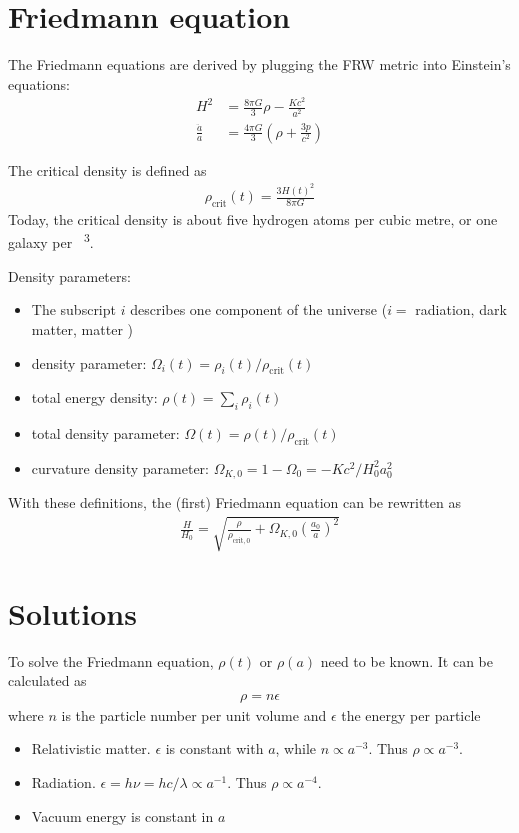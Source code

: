 \section{Friedmann equation}
\label{sec:Friedmann}

The Friedmann equations are derived by plugging the FRW metric into Einstein's equations:
\begin{align*}
	H^2 &= \frac{8 \pi G}{3} \rho - \frac{K c^2}{a^2}\\
	\frac{\ddot{a}}{a} &= \frac{4 \pi G}{3} \left( \rho + \frac{3 p}{c^2} \right)
\end{align*}

The critical density is defined as
\begin{align*}
	\rho_\text{crit}(t) = \frac{3 H(t)^2}{8 \pi G}
\end{align*}
Today, the critical density is about five hydrogen atoms per cubic metre, or one galaxy per \si{\mega\parsec\cubed}.

Density parameters:
\begin{itemize}
	\item The subscript $i$ describes one component of the universe ($i = $ radiation, dark matter, matter \textellipsis)
	\item density parameter: $\Omega_i(t) = \rho_i(t)/\rho_\text{crit}(t)$
	\item total energy density: $\rho(t) = \sum_{i} \rho_i(t)$
	\item total density parameter: $\Omega(t) = \rho(t)/\rho_\text{crit}(t)$
	\item curvature density parameter: $\Omega_{K,0} = 1 - \Omega_0 = - Kc^2/H_0^2 a_0^2$
\end{itemize}

With these definitions, the (first) Friedmann equation can be rewritten as
\begin{align*}
	\frac{H}{H_0} = \sqrt{\frac{\rho}{\rho_{\text{crit}, 0}} + \Omega_{K,0} \left( \frac{a_0}{a} \right)^2 }
\end{align*}




\section{Solutions}

To solve the Friedmann equation, $\rho(t)$ or $\rho(a)$ need to be known. It can be calculated as
\begin{align*}
	\rho = n \epsilon
\end{align*}
where $n$ is the particle number per unit volume and $\epsilon$ the energy per particle
\begin{itemize}
	\item Relativistic matter. $\epsilon$ is constant with $a$, while $n \propto a^{-3}$. Thus $\rho \propto a^{-3}$.
	\item Radiation. $\epsilon = h \nu = h c / \lambda \propto a^{-1}$. Thus $\rho \propto a^{-4}$.
	\item Vacuum energy is constant in $a$
\end{itemize}

